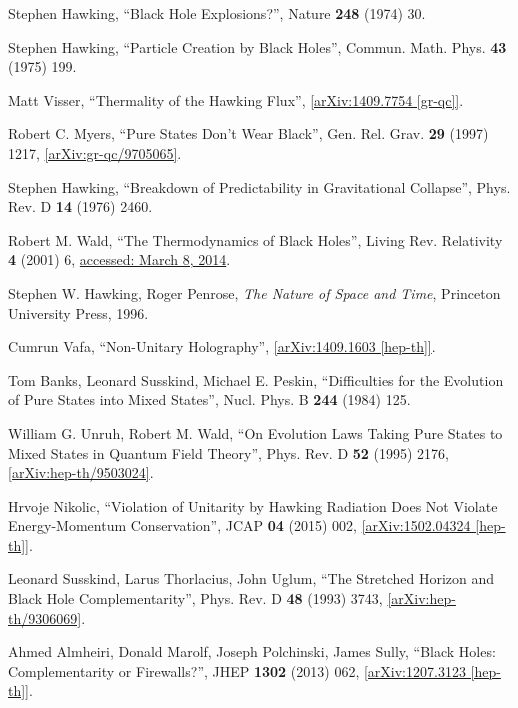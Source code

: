 \documentclass[12pt]{article}
\newcommand{\2}{$^2$}
\newcommand{\3}{$^3$}
\newcommand{\4}{$_4$}
\newcommand{\5}{$_5$}
\begin{document}
\begin{thebibliography}{400}
\raggedright

Stephen Hawking, ``Black Hole Explosions?'', Nature \textbf{248} (1974) 30.

Stephen Hawking, ``Particle Creation by Black Holes'', Commun. Math. Phys. \textbf{43} (1975) 199.

Matt Visser, ``Thermality of the Hawking Flux'', \href{http://arxiv.org/abs/1409.7754}{[arXiv:1409.7754 [gr-qc]]}.

Robert C. Myers, ``Pure States Don't Wear Black'', Gen. Rel. Grav. \textbf{29} (1997) 1217, \href{http://arxiv.org/abs/gr-qc/9705065}{[arXiv:gr-qc/9705065]}.

Stephen Hawking, ``Breakdown of Predictability in Gravitational Collapse'', Phys. Rev. D \textbf{14} (1976) 2460.


Robert M. Wald, ``The Thermodynamics of Black Holes'', 
Living Rev. Relativity \textbf{4} (2001) 6, \href{http://www.livingreviews.org/lrr-2001-6}{accessed: March 8, 2014}.

Stephen W. Hawking, Roger Penrose, \emph{The Nature of Space and Time}, Princeton University Press, 1996. 

Cumrun Vafa, ``Non-Unitary Holography'', \href{http://arxiv.org/abs/1409.1603}{[arXiv:1409.1603 [hep-th]]}.


Tom Banks, Leonard Susskind, Michael E. Peskin, ``Difficulties for the Evolution of Pure States into Mixed States'', Nucl. Phys. B \textbf{244} (1984) 125. 

William G. Unruh, Robert M. Wald, 
``On Evolution Laws Taking Pure States to Mixed States in Quantum Field Theory'',
Phys. Rev. D \textbf{52} (1995) 2176, \href{http://arxiv.org/abs/hep-th/9503024}{[arXiv:hep-th/9503024]}.

Hrvoje Nikolic, ``Violation of Unitarity by Hawking Radiation Does Not Violate Energy-Momentum Conservation'', JCAP \textbf{04} (2015) 002, \href{http://arxiv.org/abs/1502.04324}{[arXiv:1502.04324 [hep-th]]}.

Leonard Susskind, Larus Thorlacius, John Uglum, ``The Stretched Horizon and Black
Hole Complementarity'', Phys. Rev. D \textbf{48} (1993) 3743, \href{http://arxiv.org/abs/hep-th/9306069}{[arXiv:hep-th/9306069]}.

Ahmed Almheiri, Donald Marolf, Joseph Polchinski, James Sully, ``Black Holes: Complementarity or Firewalls?'', JHEP \textbf{1302} (2013) 062, \href{http://arxiv.org/abs/1207.3123}{[arXiv:1207.3123 [hep-th]]}.


\end{thebibliography}
\end{document}
